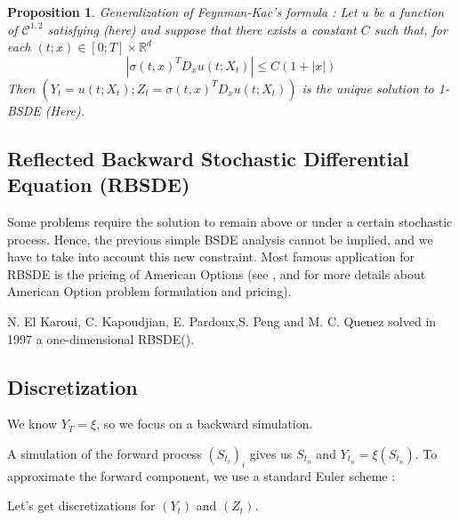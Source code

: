 \documentclass[english,11pt,openany]{article}
\theoremstyle{definition}
\theoremstyle{plain}
\newtheorem{Prop}[Th]{Proposition}
\theoremstyle{definition}
\begin{document}
	\begin{Prop}
		Generalization of Feynman-Kac's formula : \newline
		Let $u$ be a function of $\mathcal{C}^{1,2}$ satisfying (here) and suppose that there exists a
		constant $C$ such that, for each $(t; x) \in [0; T] \times \mathbb{R}^d$
		\begin{equation}
		|\sigma(t,x)^T D_xu(t;X_t)|\leq C(1 + |x|)
		\end{equation}
		Then $(Y_t = u(t;X_t);Z_t =\sigma(t,x)^T D_xu(t;X_t))$ is the unique solution to 1-
		BSDE (Here).
	\end{Prop} 
	
	
	\subsection{Reflected Backward Stochastic Differential Equation (RBSDE)}
	
	Some problems require the solution to remain above or under a certain stochastic process. Hence, the previous simple BSDE analysis cannot be implied, and we have to take into account this new constraint. 
	Most famous application for RBSDE is the pricing of American Options (see \cite{warin:amoption}, \cite{rodgers:amoption} and \cite{glasserman:amoption} for more details about American Option problem formulation and pricing). 
	
	N. El Karoui, C. Kapoudjian, E. Pardoux,S. Peng and M. C. Quenez solved in 1997 a one-dimensional RBSDE(). 
	
	\subsection{Discretization}
	
	We know $Y_T = \xi$, so we focus on a backward simulation. 
	
	A simulation of the forward process $(S_{t_i})_i$ gives us $S_{t_n}$ and $Y_{t_n} = \xi(S_{t_n})$. To approximate the forward component, we use a standard Euler
	scheme : 
	
	Let's get discretizations for $(Y_t)$ and $(Z_t)$. 
	
\end{document}
